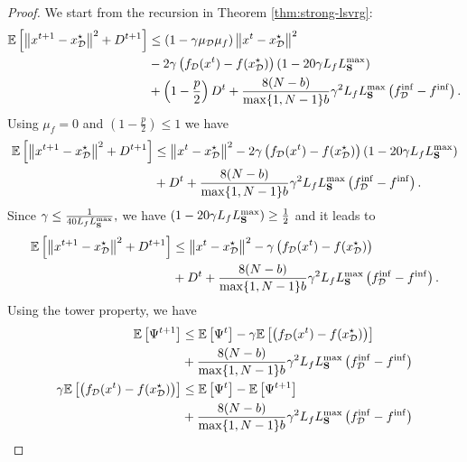\documentclass{article}
\newcommand{\bb}{\mathbb}
\newcommand{\cD}{\mathcal{D}}
\newcommand{\Exp}[1]{{\bb E}\left[#1\right]}
\theoremstyle{plain}
\newcommand{\tf}{f_{\mathcal{D}}}
\newcommand{\mS}{{\bf S}}
\theoremstyle{plain}
\theoremstyle{definition}
\theoremstyle{remark}
\begin{document}
\begin{proof}
    We start from the recursion in Theorem \ref{thm:strong-lsvrg}:
    	\begin{equation*}
		\begin{split}
			\Exp{\left\|x^{t+1} - x_\cD^\star\right\|^2 + D^{t+1}} & \leq
			 \left(1-\gamma\mu_{\mathcal{D}}\mu_f\right)\left\|x^{t}- x_\cD^\star\right\|^2\\& - 2\gamma\left(\tf(x^t) - f(x_\cD^\star)\right)\left(1 - 20\gamma L_fL_{\mS}^{\max}\right)\\
			& + \left(1-\frac{p}{2}\right)D^t +  \frac{8(N-b)}{\max\{1,N-1\}b} \gamma^2 L_fL_{\mS}^{\max}\left(\tf^{\inf} - f^{\inf}\right).
		\end{split}
	\end{equation*}
 Using $\mu_f = 0$ and $\left( 1- \frac{p}{2} \right) \leq 1$ we have
     	\begin{equation*}
		\begin{split}
			\Exp{\left\|x^{t+1} - x_\cD^\star\right\|^2 + D^{t+1}} & \leq
			 \left\|x^{t}- x_\cD^\star\right\|^2 - 2\gamma\left(\tf(x^t) - f(x_\cD^\star)\right)\left(1 - 20\gamma L_fL_{\mS}^{\max}\right)\\
			& + D^t +  \frac{8(N-b)}{\max\{1,N-1\}b} \gamma^2 L_fL_{\mS}^{\max}\left(\tf^{\inf} - f^{\inf}\right).
		\end{split}
	\end{equation*}
 Since $\gamma\leq \frac{1}{40L_fL_{\mS}^{\max}},$ we have $\left(1 - 20\gamma L_fL_{\mS}^{\max}\right) \geq \frac{1}{2}$ and it leads to
      	\begin{equation*}
		\begin{split}
			\Exp{\left\|x^{t+1} - x_\cD^\star\right\|^2 + D^{t+1}} & \leq
			 \left\|x^{t}- x_\cD^\star\right\|^2 - \gamma\left(\tf(x^t) - f(x_\cD^\star)\right)\\
			& + D^t +  \frac{8(N-b)}{\max\{1,N-1\}b} \gamma^2 L_fL_{\mS}^{\max}\left(\tf^{\inf} - f^{\inf}\right).
		\end{split}
	\end{equation*}
 Using the tower property, we have
       	\begin{equation*}
		\begin{split}
			\Exp{\Psi^{t+1}} & \leq
			 \Exp{\Psi^t}-\gamma\Exp{\left(\tf(x^t) - f(x_\cD^\star)\right)}\\ & + \frac{8(N-b)}{\max\{1,N-1\}b} \gamma^2 L_fL_{\mS}^{\max}\left(\tf^{\inf} - f^{\inf}\right)\\
    \gamma\Exp{\left(\tf(x^t) - f(x_\cD^\star)\right)} &\leq \Exp{\Psi^t} - \Exp{\Psi^{t+1}}\\&+ \frac{8(N-b)}{\max\{1,N-1\}b} \gamma^2 L_fL_{\mS}^{\max}\left(\tf^{\inf} - f^{\inf}\right)\\

\end{split}
\end{equation*}
\end{proof}
\end{document}

